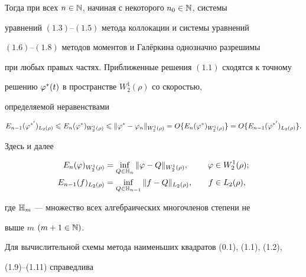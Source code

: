 \begin{thm}
Тогда при всех $n\in \Bbb N$, начиная с некоторого $n_0\in \Bbb N$, системы 


уравнений $(1.3)$--$(1.5)$ метода коллокации и системы уравнений


$(1.6)$--$(1.8)$ методов моментов и Гал\"еркина однозначно разрешимы 


при любых правых частях. Приближенные решения $(1.1)$ сходятся к точному 


решению $\varphi^*(t)$ в пространстве $W_2^1(\rho)$ со скоростью, 


определяемой неравенствами


\begin{equation}


E_{n-1}(\vp^{*'})_{L_2(\rho)}\lea E_n(\vp^*)_{W_2^1(\rho)}\lea


\|\vp^* - \vp_n\|_{W_2^1(\rho)} = 


O\{E_n(\vp^*)_{W_2^1(\rho)}\} = O\{E_{n-1}(\vp^{*'})_{L_2(\rho)}\}.


\end{equation}


\end{thm}





Здесь и далее


\begin{alignat*}{2}


E_n(\vp)_{W_2^1(\rho)} &= \inf\limits_{Q\in \H_n}\|\vp -


Q\|_{W_2^1(\rho)},&\quad \vp&\in W_2^1(\rho);\\


%


E_{n-1}(f)_{L_2(\rho)} &= \inf\limits_{Q\in \H_{n-1}}\|f-Q\|_{L_2(\rho)},


&\quad f&\in L_2(\rho),


\end{alignat*}


где $\Bbb H_m$ --- множество всех алгебраических многочленов степени не 


выше $m$ $(m+1\in \Bbb N)$.





Для вычислительной схемы метода наименьших квадратов (0.1), (1.1), (1.2),


(1.9)--(1.11) справедлива





